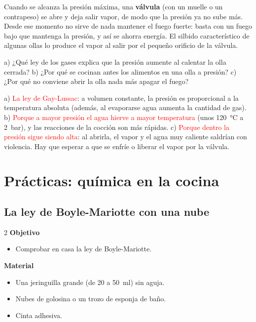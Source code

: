 Cuando se alcanza la presión máxima, una \textbf{válvula} (con un muelle o un contrapeso) se abre y deja salir vapor, de modo
que la presión ya no sube más. Desde ese momento no sirve de nada mantener el fuego fuerte: basta con un fuego bajo que
mantenga la presión, y así se ahorra energía. El silbido característico de algunas ollas lo produce el vapor al salir por el
pequeño orificio de la válvula.

\begin{exercise}
    a) ¿Qué ley de los gases explica que la presión aumente al calentar la olla cerrada? b) ¿Por qué se cocinan antes los
    alimentos en una olla a presión? c) ¿Por qué no conviene abrir la olla nada más apagar el fuego?
    \begin{solu}
        a) \textcolor{red}{La ley de Gay-Lussac}: a volumen constante, la presión es proporcional a la temperatura absoluta (además, al
        evaporarse agua aumenta la cantidad de gas). b) \textcolor{red}{Porque a mayor presión el agua hierve a mayor temperatura}
        (unos \qty{120}{\degreeCelsius} a \qty{2}{\bar}), y las reacciones de la cocción son más rápidas. c) \textcolor{red}{Porque dentro
        la presión sigue siendo alta}: al abrirla, el vapor y el agua muy caliente saldrían con violencia. Hay que esperar a que se
        enfríe o liberar el vapor por la válvula.
    \end{solu}
\end{exercise}

\section{Prácticas: química en la cocina}\label{sec:ud1-practicas}

\subsection{La ley de Boyle-Mariotte con una nube}

\begin{multicols}{2}
    \textbf{Objetivo}
    \begin{itemize}
        \item Comprobar en casa la ley de Boyle-Mariotte.
    \end{itemize}
    \columnbreak
    \textbf{Material}
    \begin{itemize}
        \item Una jeringuilla grande (de 20 a \qty{50}{\milli\litre}) sin aguja.
        \item Nubes de golosina o un trozo de esponja de baño.
        \item Cinta adhesiva.
    \end{itemize}
\end{multicols}

